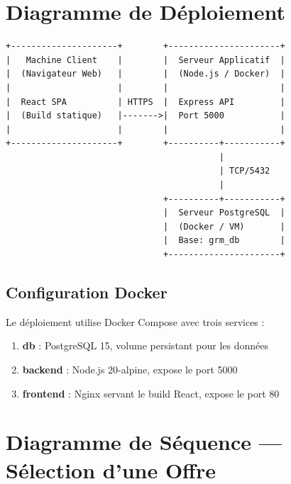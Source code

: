 \section{Diagramme de Déploiement}

\begin{verbatim}
+---------------------+        +----------------------+
|   Machine Client    |        |  Serveur Applicatif  |
|  (Navigateur Web)   |        |  (Node.js / Docker)  |
|                     |        |                      |
|  React SPA          | HTTPS  |  Express API         |
|  (Build statique)   |------->|  Port 5000           |
|                     |        |                      |
+---------------------+        +----------+-----------+
                                          |
                                          | TCP/5432
                                          |
                               +----------+-----------+
                               |  Serveur PostgreSQL  |
                               |  (Docker / VM)       |
                               |  Base: grm_db        |
                               +----------------------+
\end{verbatim}

\subsection{Configuration Docker}

Le déploiement utilise Docker Compose avec trois services :
\begin{enumerate}
    \item \textbf{db} : PostgreSQL 15, volume persistant pour les données
    \item \textbf{backend} : Node.js 20-alpine, expose le port 5000
    \item \textbf{frontend} : Nginx servant le build React, expose le port 80
\end{enumerate}

\section{Diagramme de Séquence — Sélection d'une Offre}


